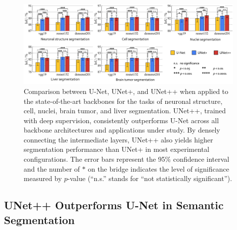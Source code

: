 \begin{figure}
\begin{center}
\includegraphics[width=1.0\columnwidth]{Figures/CH4/fig_various_backbones.pdf}
\end{center}
\caption[Comparison of U-Net, UNet+, and UNet++ with Varying Backbones]{
Comparison between U-Net, UNet+, and UNet++ when applied to the state-of-the-art backbones for the tasks of neuronal structure, cell, nuclei, brain tumor, and liver segmentation.
UNet++, trained with deep supervision, consistently outperforms U-Net across all backbone architectures and applications under study. By densely connecting the intermediate layers, UNet++ also yields higher segmentation performance than UNet+ in most experimental configurations.
The error bars represent the 95\% confidence interval and the number of $\ast$ on the bridge indicates the level of significance measured by $p$-value (``n.s.'' stands for ``not statistically significant'').}
\label{ch4:fig:various_backbones}
\end{figure}



\subsection{UNet++ Outperforms U-Net in Semantic Segmentation}
\label{ch4:semantic_results}

